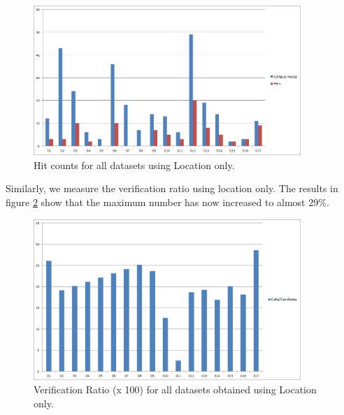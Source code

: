 \begin{figure}[ht]
\centering
\includegraphics[width=0.9\textwidth]{media/chapter5/loc-unique-faces-hits-all-datasets.png}
\caption{Hit counts for all datasets using Location only.}
\label{fig:exp-loc-hits}
\end{figure}

Similarly, we measure the verification ratio using location only. The results in figure \ref{fig:exp-loc-verification-ratio} show that the maximum number has now increased to almost 29\%. 

\begin{figure}[h!]
\centering
\includegraphics[width=0.9\textwidth]{media/chapter5/loc-verification-ratio-all-datasets.png}
\caption{Verification Ratio (x 100) for all datasets obtained using Location only.}
\label{fig:exp-loc-verification-ratio}
\end{figure}


